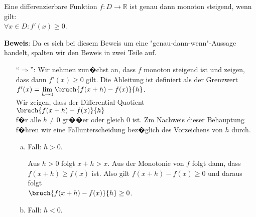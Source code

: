 \begin{Satz}
  Eine differenzierbare Funktion $f:D \rightarrow \mathbb{R}$ ist genau dann
  monoton steigend, wenn gilt: 
  \\[0.2cm]
  \hspace*{1.3cm} $\forall x \in D: f'(x) \geq 0$.
  \eod
\end{Satz}

\noindent
\textbf{Beweis}: Da es sich bei diesem Beweis um eine "genau-dann-wenn"-Aussage handelt, spalten wir
den Beweis in zwei Teile auf.
\begin{enumerate}
\item[``$\Rightarrow$'':]  Wir nehmen zun�chst an, dass $f$ monoton steigend ist und zeigen, dass
      dann $f'(x) \geq 0$ gilt.  Die Ableitung ist definiert als der Grenzwert 
      \\[0.3cm]
      \hspace*{1.3cm} $f'(x) = \lim\limits_{h \rightarrow 0} \bruch{f(x+h) - f(x)}{h}$.
      \\[0.3cm]
      Wir zeigen, dass der Differential-Quotient 
      \\[0.3cm]
      \hspace*{1.3cm} $\bruch{f(x+h) - f(x)}{h}$
      \\[0.3cm]
      f�r alle $h \not = 0$ gr��er oder gleich 0 ist.  Zm Nachweis dieser Behauptung f�hren wir
      eine Fallunterscheidung bez�glich des Vorzeichens von $h$ durch.
      \begin{enumerate}[(a)]
      \item Fall: $h > 0$.
        
            Aus $h > 0$ folgt $x + h > x$.  Aus der Monotonie von $f$ folgt dann,  dass 
            $f(x+h) \geq f(x)$ ist.  Also gilt $f(x+h)-f(x) \geq 0$ und daraus folgt
            \\[0.3cm]
            \hspace*{1.3cm} $\bruch{f(x+h) - f(x)}{h} \geq 0$.
      \item Fall: $h < 0$.
        

\end{enumerate}
\end{enumerate}
